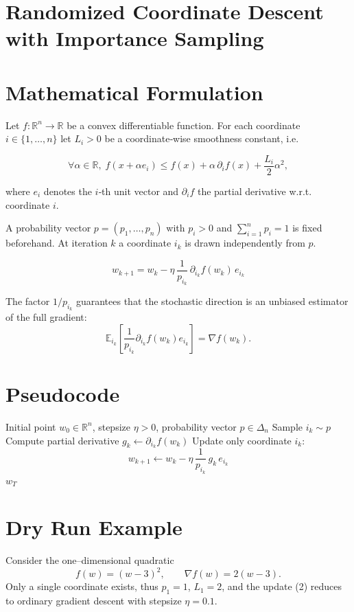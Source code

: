 \documentclass{article}
\newcommand{\E}{\mathbb{E}}
\newcommand{\R}{\mathbb{R}}
\begin{document}
\section*{Randomized Coordinate Descent with Importance Sampling}

\section*{Mathematical Formulation}
Let $f:\R^{n}\rightarrow\R$ be a convex differentiable function.  
For each coordinate $i\in\{1,\dots,n\}$ let $L_i>0$ be a coordinate‑wise smoothness constant, i.e.

\[
\forall \alpha\in\R,\; f(x+\alpha e_i)\le 
f(x)+\alpha\,\partial_i f(x)+\frac{L_i}{2}\alpha^{2},
\tag{1}
\]

where $e_i$ denotes the $i$‑th unit vector and $\partial_i f$ the partial derivative w.r.t. coordinate $i$.

A probability vector $p=(p_1,\dots,p_n)$ with $p_i>0$ and $\sum_{i=1}^{n}p_i=1$ is fixed beforehand.  
At iteration $k$ a coordinate $i_k$ is drawn independently from $p$.

\[
\boxed{\;
w_{k+1}=w_{k}-\eta\,\frac{1}{p_{i_k}}\,\partial_{i_k}f(w_{k})\,e_{i_k}
\;}
\tag{2}
\]

The factor $1/p_{i_k}$ guarantees that the stochastic direction is an unbiased estimator of the full gradient:
\[
\E_{i_k}\!\left[\frac{1}{p_{i_k}}\partial_{i_k}f(w_{k})e_{i_k}\right]=\nabla f(w_{k}).
\tag{3}
\]

\section*{Pseudocode}
\begin{algorithm}[H]
\caption{Randomized Coordinate Descent (RCD)}
\begin{algorithmic}[1]
\Require Initial point $w_{0}\in\R^{n}$, stepsize $\eta>0$, probability vector $p\in\Delta_{n}$
    \State Sample $i_k\sim p$  
    \State Compute partial derivative $g_{k} \gets \partial_{i_k}f(w_{k})$
    \State Update only coordinate $i_k$:
    \[
    w_{k+1}\gets w_{k}-\eta\,\frac{1}{p_{i_k}}\,g_{k}\,e_{i_k}
    \]
\EndFor
\State \Return $w_T$
\end{algorithmic}
\end{algorithm}

\section*{Dry Run Example}
Consider the one–dimensional quadratic
\[
f(w)=(w-3)^{2},\qquad \nabla f(w)=2(w-3).
\]
Only a single coordinate exists, thus $p_{1}=1$, $L_{1}=2$, and the update (2) reduces to ordinary gradient descent with stepsize $\eta=0.1$.
\end{document}
